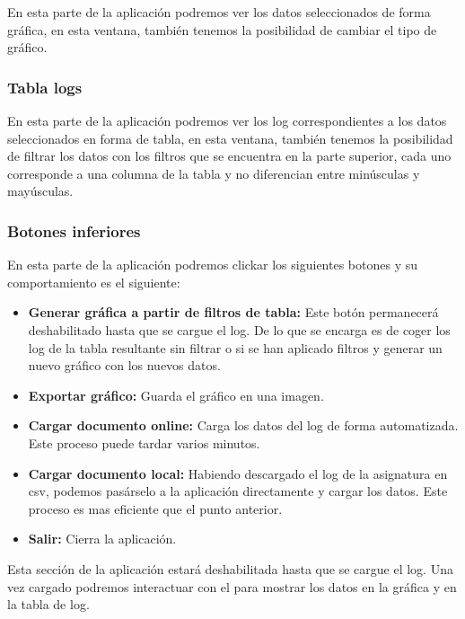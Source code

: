 En esta parte de la aplicación podremos ver los datos seleccionados de forma gráfica, en esta ventana, también tenemos la posibilidad de cambiar el tipo de gráfico.


\subsubsection{Tabla logs}

En esta parte de la aplicación podremos ver los log correspondientes a los datos seleccionados en forma de tabla, en esta ventana, también tenemos la posibilidad de filtrar los datos con los filtros que se encuentra en la parte superior, cada uno corresponde a una columna de la tabla y no diferencian entre minúsculas y mayúsculas.


\subsubsection{Botones inferiores}

En esta parte de la aplicación podremos clickar los siguientes botones y su comportamiento es el siguiente:

\begin{itemize}
	\tightlist
	\item
	\textbf{Generar gráfica a partir de filtros de tabla:} Este botón permanecerá deshabilitado hasta que se cargue el log. De lo que se encarga es de coger los log de la tabla resultante sin filtrar o si se han aplicado filtros y generar un nuevo gráfico con los nuevos datos.
	\item
	\textbf{Exportar gráfico:} Guarda el gráfico en una imagen.
	\item
	\textbf{Cargar documento online:} Carga los datos del log de forma automatizada. Este proceso puede tardar varios minutos.
	\item
	\textbf{Cargar documento local:} Habiendo descargado el log de la asignatura en csv, podemos pasárselo a la aplicación directamente y cargar los datos. Este proceso es mas eficiente que el punto anterior.
	\item
	\textbf{Salir:} Cierra la aplicación.
	
	
\end{itemize}


Esta sección de la aplicación estará deshabilitada hasta que se cargue el log. Una vez cargado podremos interactuar con el para mostrar los datos en la gráfica y en la tabla de log.

